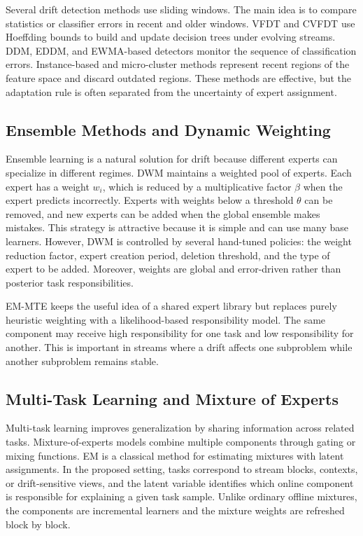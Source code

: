 ﻿\documentclass[12pt,a4paper]{article}
\begin{document}
Several drift detection methods use sliding windows. The main idea is to compare statistics or classifier errors in recent and older windows. VFDT and CVFDT use Hoeffding bounds to build and update decision trees under evolving streams. DDM, EDDM, and EWMA-based detectors monitor the sequence of classification errors. Instance-based and micro-cluster methods represent recent regions of the feature space and discard outdated regions. These methods are effective, but the adaptation rule is often separated from the uncertainty of expert assignment.

\subsection{Ensemble Methods and Dynamic Weighting}
Ensemble learning is a natural solution for drift because different experts can specialize in different regimes. DWM maintains a weighted pool of experts. Each expert has a weight $w_i$, which is reduced by a multiplicative factor $\beta$ when the expert predicts incorrectly. Experts with weights below a threshold $\theta$ can be removed, and new experts can be added when the global ensemble makes mistakes. This strategy is attractive because it is simple and can use many base learners. However, DWM is controlled by several hand-tuned policies: the weight reduction factor, expert creation period, deletion threshold, and the type of expert to be added. Moreover, weights are global and error-driven rather than posterior task responsibilities.

EM-MTE keeps the useful idea of a shared expert library but replaces purely heuristic weighting with a likelihood-based responsibility model. The same component may receive high responsibility for one task and low responsibility for another. This is important in streams where a drift affects one subproblem while another subproblem remains stable.

\subsection{Multi-Task Learning and Mixture of Experts}
Multi-task learning improves generalization by sharing information across related tasks. Mixture-of-experts models combine multiple components through gating or mixing functions. EM is a classical method for estimating mixtures with latent assignments. In the proposed setting, tasks correspond to stream blocks, contexts, or drift-sensitive views, and the latent variable identifies which online component is responsible for explaining a given task sample. Unlike ordinary offline mixtures, the components are incremental learners and the mixture weights are refreshed block by block.
\end{document}
